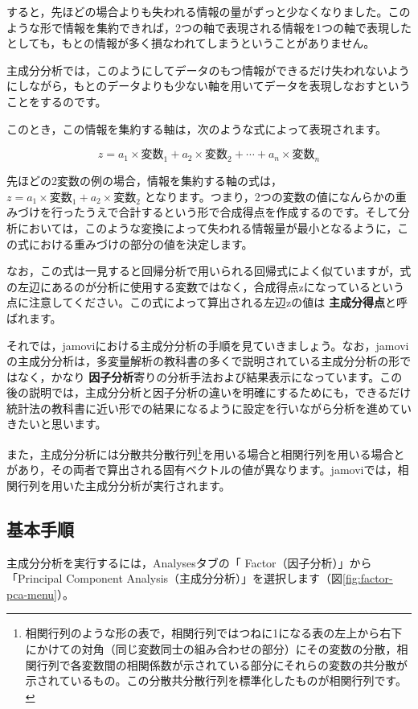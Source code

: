 \documentclass[
  12pt,
  a5jpaper,
  lualatex, ja=standard]{bxjsbook}
\renewcommand{\emph}[1]{\textbf{\color{emph} #1}}
\newcommand{\infig}[1]{\raisebox{-.2\zh}{\texttt{[image: images/assets/\#1]}}}
\begin{document}
すると，先ほどの場合よりも失われる情報の量がずっと少なくなりました。このような形で情報を集約できれば，2つの軸で表現される情報を1つの軸で表現したとしても，もとの情報が多く損なわれてしまうということがありません。

主成分分析では，このようにしてデータのもつ情報ができるだけ失われないようにしながら，もとのデータよりも少ない軸を用いてデータを表現しなおすということをするのです。

このとき，この情報を集約する軸は，次のような式によって表現されます。

\[
z = a_1 \times \text{変数}_1 + a_2 \times \text{変数}_2 + \cdots + a_n \times \text{変数}_n
\]

先ほどの2変数の例の場合，情報を集約する軸の式は，\(z=a_1\times\text{変数}_1+a_2\times\text{変数}_2\) となります。つまり，2つの変数の値になんらかの重みづけを行ったうえで合計するという形で合成得点を作成するのです。そして分析においては，このような変換によって失われる情報量が最小となるように，この式における重みづけの部分の値を決定します。

なお，この式は一見すると回帰分析で用いられる回帰式によく似ていますが，式の左辺にあるのが分析に使用する変数ではなく，合成得点zになっているという点に注意してください。この式によって算出される左辺zの値は\emph{主成分得点}と呼ばれます。

それでは，jamoviにおける主成分分析の手順を見ていきましょう。なお，jamoviの主成分分析は，多変量解析の教科書の多くで説明されている主成分分析の形ではなく，かなり\emph{因子分析}寄りの分析手法および結果表示になっています。この後の説明では，主成分分析と因子分析の違いを明確にするためにも，できるだけ統計法の教科書に近い形での結果になるように設定を行いながら分析を進めていきたいと思います。

また，主成分分析には分散共分散行列\footnote{相関行列のような形の表で，相関行列ではつねに1になる表の左上から右下にかけての対角（同じ変数同士の組み合わせの部分）にその変数の分散，相関行列で各変数間の相関係数が示されている部分にそれらの変数の共分散が示されているもの。この分散共分散行列を標準化したものが相関行列です。}を用いる場合と相関行列を用いる場合とがあり，その両者で算出される固有ベクトルの値が異なります。jamoviでは，相関行列を用いた主成分分析が実行されます。

\hypertarget{sub:factor-pca-procedure}{%
\subsection{基本手順}\label{sub:factor-pca-procedure}}

主成分分析を実行するには，Analysesタブの「\infig{analysis-factor.pdf} Factor（因子分析）」から「Principal Component Analysis（主成分分析）」を選択します（図\ref{fig:factor-pca-menu}）。
\end{document}
